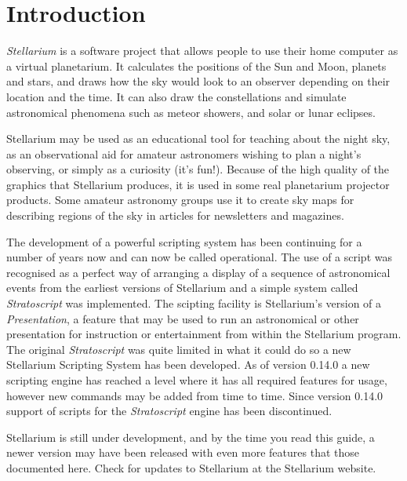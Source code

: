 

\chapter{Introduction}
\label{ch:Introduction}

\emph{Stellarium} is a software project that allows people to use their
home computer as a virtual planetarium. It calculates the positions of
the Sun and Moon, planets and stars, and draws how the sky would look to
an observer depending on their location and the time. It can also draw
the constellations and simulate astronomical phenomena such as meteor
showers, and solar or lunar eclipses.

Stellarium may be used as an educational tool for teaching about the
night sky, as an observational aid for amateur astronomers wishing to
plan a night's observing, or simply as a curiosity (it's fun!). Because
of the high quality of the graphics that Stellarium produces, it is used
in some real planetarium projector products. Some amateur astronomy
groups use it to create sky maps for describing regions of the sky in
articles for newsletters and magazines.

The development of a powerful scripting system has been continuing for
a number of years now and can now be called operational. The use of a
script was recognised as a perfect way of arranging a display of a
sequence of astronomical events from the earliest versions of
Stellarium and a simple system called \emph{Stratoscript} was
implemented. The scipting facility is Stellarium's version of a
\emph{Presentation}, a feature that may be used to run an astronomical
or other presentation for instruction or entertainment from within the
Stellarium program. The original \emph{Stratoscript} was quite limited in
what it could do so a new Stellarium Scripting System has been
developed. As of version 0.14.0 a new scripting engine 
has reached a level where it 
has all required features for usage, however new
commands may be added from time to time. Since version 0.14.0 support
of scripts for the \emph{Stratoscript} engine has been discontinued.

Stellarium is still under  development, and by the time you read
this guide, a newer version may have been released with even more
features that those documented here. Check for updates to Stellarium at
the Stellarium website.

